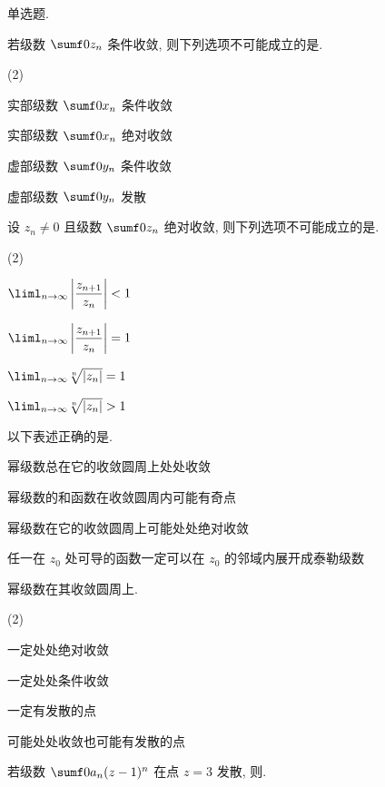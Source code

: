 \begin{homework}
  \item 单选题.
  \begin{subex}
    \item 若级数 $\sumf0 z_n$ 条件收敛, 则下列选项不可能成立的是\fillbrace{}.
      \begin{exchoice}(2)
        \item 实部级数 $\sumf0 x_n$ 条件收敛
        \item 实部级数 $\sumf0 x_n$ 绝对收敛
        \item 虚部级数 $\sumf0 y_n$ 条件收敛
        \item 虚部级数 $\sumf0 y_n$ 发散
      \end{exchoice}
    \item 设 $z_n\neq0$ 且级数 $\sumf0 z_n$ 绝对收敛, 则下列选项不可能成立的是\fillbrace{}.
      \begin{exchoice}(2)
        \item $\liml_{n\ra\infty}\abs{\dfrac{z_{n+1}}{z_n}}<1$
        \item $\liml_{n\ra\infty}\abs{\dfrac{z_{n+1}}{z_n}}=1$
        \item $\liml_{n\ra\infty}\sqrt[n]{|z_n|}=1$
        \item $\liml_{n\ra\infty}\sqrt[n]{|z_n|}>1$
      \end{exchoice}
    \item 以下表述正确的是\fillbrace{}.
      \begin{exchoice}
        \item 幂级数总在它的收敛圆周上处处收敛
        \item 幂级数的和函数在收敛圆周内可能有奇点
        \item 幂级数在它的收敛圆周上可能处处绝对收敛
        \item 任一在 $z_0$ 处可导的函数一定可以在 $z_0$ 的邻域内展开成泰勒级数
      \end{exchoice}
    \item 幂级数在其收敛圆周上\fillbrace{}.
      \begin{exchoice}(2)
        \item 一定处处绝对收敛
        \item 一定处处条件收敛
        \item 一定有发散的点
        \item 可能处处收敛也可能有发散的点
      \end{exchoice}
    \item 若级数 $\sumf0 a_n(z-1)^n$ 在点 $z=3$ 发散, 则\fillbrace{}.

\end{subex}
\end{homework}
